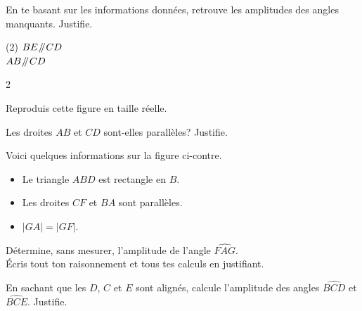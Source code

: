 \documentclass[../../syllabus_2.tex]{subfiles}
\begin{document}
\begin{exercise}
    En te basant sur les informations données, retrouve les amplitudes des angles manquants. Justifie.
    \begin{tasks}(2)
        \task $BE\mathbin{\!/\mkern-5mu/\!} CD$\\
        
        \task $AB\mathbin{\!/\mkern-5mu/\!} CD$\\
        
    \end{tasks}
\end{exercise}


\setlength{\columnsep}{20pt}
\begin{multicols}{2}
    \begin{exercise}
        Reproduis cette figure en taille réelle.
        \begin{center}
            
        \end{center}
    \end{exercise}

    \begin{exercise}
        Les droites $AB$ et $CD$ sont-elles parallèles? Justifie.
        \begin{center}
            
        \end{center}
    \end{exercise}
\end{multicols}
\setlength{\columnsep}{10pt}
\begin{exercise}
    Voici quelques informations sur la figure ci-contre.
    \begin{itemize}
        \item Le triangle $ABD$ est rectangle en $B$.
        \item Les droites $CF$ et $BA$ sont parallèles.
        \item $|GA| = |GF|$.
    \end{itemize}
    Détermine, sans mesurer, l'amplitude de l'angle $\widehat{FAG}$.\\
    Écris tout ton raisonnement et tous tes calculs en justifiant.
    \begin{center}
        
    \end{center}
\end{exercise}
\begin{exercise}
    En sachant que les $D$, $C$ et $E$ sont alignés, calcule l'amplitude
    des angles $\widehat{BCD}$ et $\widehat{BCE}$. Justifie.
    \begin{center}
        
    \end{center}
\end{exercise}
\end{document}
